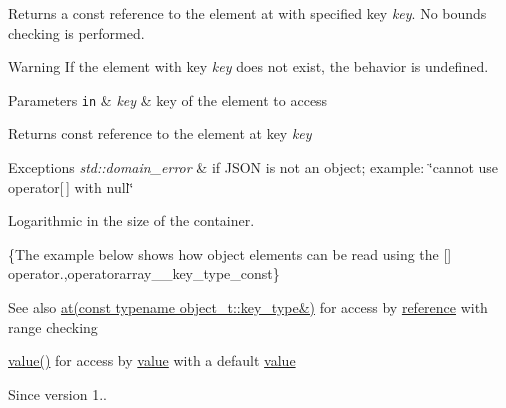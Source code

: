 Returns a const reference to the element at with specified key {\itshape key}. No bounds checking is performed.

\begin{DoxyWarning}{Warning}
If the element with key {\itshape key} does not exist, the behavior is undefined.
\end{DoxyWarning}

\begin{DoxyParams}[1]{Parameters}
\mbox{\tt in}  & {\em key} & key of the element to access\\
\hline
\end{DoxyParams}
\begin{DoxyReturn}{Returns}
const reference to the element at key {\itshape key} 
\end{DoxyReturn}

\begin{DoxyExceptions}{Exceptions}
{\em std\+::domain\+\_\+error} & if J\+S\+ON is not an object; example\+: {\ttfamily \char`\"{}cannot use
operator\mbox{[}$\,$\mbox{]} with null\char`\"{}}\\
\hline
\end{DoxyExceptions}
Logarithmic in the size of the container.

\{The example below shows how object elements can be read using the {\ttfamily \mbox{[}\mbox{]}} operator.,operatorarray\+\_\+\+\_\+key\+\_\+type\+\_\+const\}

\begin{DoxySeeAlso}{See also}
\hyperlink{a00025_a7ed92d56cb313b243c1917696ffdf074}{at(const typename object\+\_\+t\+::key\+\_\+type\&)} for access by \hyperlink{a00025_a3ec8e17be8732fe436e9d6733f52b7a3}{reference} with range checking 

\hyperlink{a00025_a0a2cbbd95862a623e7dc5c37e67dead0}{value()} for access by \hyperlink{a00025_a0a2cbbd95862a623e7dc5c37e67dead0}{value} with a default \hyperlink{a00025_a0a2cbbd95862a623e7dc5c37e67dead0}{value}
\end{DoxySeeAlso}
\begin{DoxySince}{Since}
version 1.. 
\end{DoxySince}
